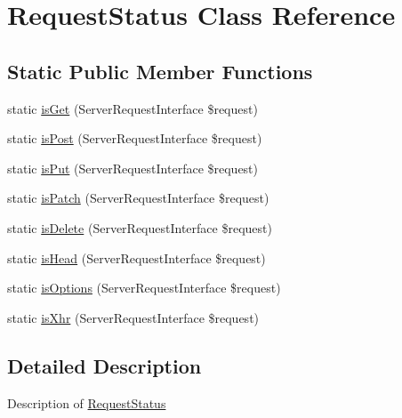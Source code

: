 \hypertarget{class_pes_1_1_http_1_1_helper_1_1_request_status}{}\section{Request\+Status Class Reference}
\label{class_pes_1_1_http_1_1_helper_1_1_request_status}
\subsection*{Static Public Member Functions}
\begin{DoxyCompactItemize}
\item 
static \mbox{\hyperlink{class_pes_1_1_http_1_1_helper_1_1_request_status_aada5ed025eb2a949bcc97d973bc72b6f}{is\+Get}} (Server\+Request\+Interface \$request)
\item 
static \mbox{\hyperlink{class_pes_1_1_http_1_1_helper_1_1_request_status_acaa75b6fcde6b8045c328ae876d61fa8}{is\+Post}} (Server\+Request\+Interface \$request)
\item 
static \mbox{\hyperlink{class_pes_1_1_http_1_1_helper_1_1_request_status_a7dbb2379506025c65456ab0dfede8e7e}{is\+Put}} (Server\+Request\+Interface \$request)
\item 
static \mbox{\hyperlink{class_pes_1_1_http_1_1_helper_1_1_request_status_a9e9a1c733f2f2b9076dfb86e50ce45e8}{is\+Patch}} (Server\+Request\+Interface \$request)
\item 
static \mbox{\hyperlink{class_pes_1_1_http_1_1_helper_1_1_request_status_ad9b861a6e5edf2c6d0297f78574068ab}{is\+Delete}} (Server\+Request\+Interface \$request)
\item 
static \mbox{\hyperlink{class_pes_1_1_http_1_1_helper_1_1_request_status_a95d8c0e60e1c9c015701106b27aa3ae1}{is\+Head}} (Server\+Request\+Interface \$request)
\item 
static \mbox{\hyperlink{class_pes_1_1_http_1_1_helper_1_1_request_status_afd0ca684b3dc9c853913bad719ffb8f8}{is\+Options}} (Server\+Request\+Interface \$request)
\item 
static \mbox{\hyperlink{class_pes_1_1_http_1_1_helper_1_1_request_status_aa5daa7897af9e297f5b0a0ee30dd75bb}{is\+Xhr}} (Server\+Request\+Interface \$request)
\end{DoxyCompactItemize}


\subsection{Detailed Description}
Description of \mbox{\hyperlink{class_pes_1_1_http_1_1_helper_1_1_request_status}{Request\+Status}}

